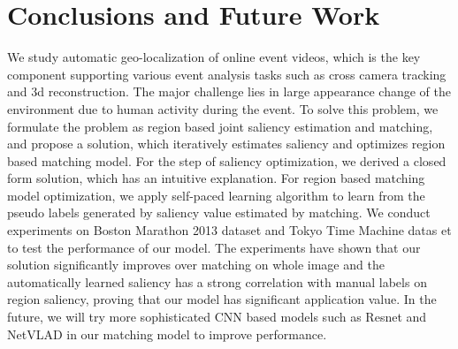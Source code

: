\section{Conclusions and Future Work}
\label{sec:conclusion}
We study automatic geo-localization of online event videos, which is the key component supporting various event analysis tasks such as cross camera tracking and 3d reconstruction. 
The major challenge lies in large appearance change of the environment due to human activity during the event. 
To solve this problem, we formulate the problem as region based joint saliency estimation and matching, and propose a solution, which iteratively estimates saliency and optimizes region based matching model.  
For the step of saliency optimization, we derived a closed form solution, which has an intuitive explanation. 
For region based matching model optimization, we apply self-paced learning algorithm to learn from the pseudo labels generated by saliency value estimated by matching. 
We conduct experiments on Boston Marathon 2013 dataset and Tokyo Time Machine datas	et to test the performance of our model. 
The experiments have shown that our solution significantly improves over matching on whole image and the automatically learned saliency has a strong correlation with manual labels on region saliency, proving that our model has significant application value. 
In the future, we will try more sophisticated CNN based models such as Resnet and NetVLAD in our matching model to improve performance.  
